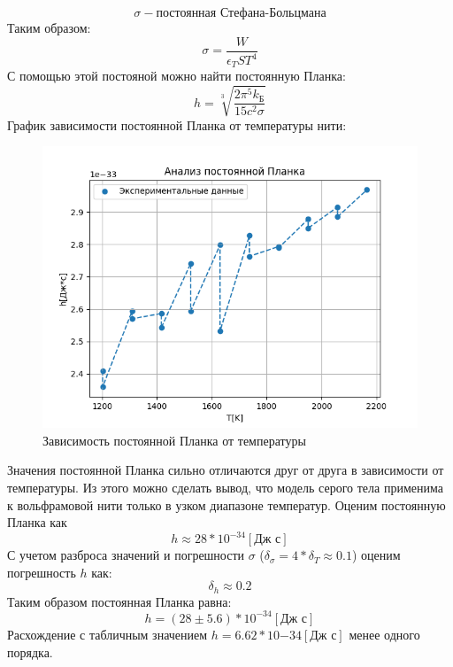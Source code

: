 \documentclass[a4paper,12pt]{article} %
\begin{document}
			\begin{equation}
				\sigma - \text{постоянная Стефана-Больцмана}
			\end{equation}
			Таким образом:
			\begin{equation}
				\sigma = \frac{W}{\epsilon_T ST^4}
			\end{equation}
			С помощью этой постояной можно найти постоянную Планка:
			\begin{equation}
				h =\sqrt[3]{\frac{2 \pi^5 k_\text{Б}}{15 c^2 \sigma}}
			\end{equation}
			График зависимости постоянной Планка от температуры нити:
			\begin{figure}[h]
				\centering
				\includegraphics[width=15cm]{img/Graph2.PNG}
				\caption{Зависимость постоянной Планка от температуры}
				\label{graph2}
			\end{figure}
			Значения постоянной Планка сильно отличаются друг от друга в зависимости от температуры.
			Из этого можно сделать вывод, что модель серого тела применима к вольфрамовой нити только в узком диапазоне температур.
			Оценим постоянную Планка как 
			\begin{equation}
				h \approx 28 * 10^{-34} [\text{Дж  с}]
			\end{equation}
			С учетом разброса значений и погрешности $\sigma$ ($\delta_\sigma = 4 * \delta_T \approx 0.1$) оценим погрешность $h$ как:
			\begin{equation}
				\delta_h \approx 0.2
			\end{equation}
			Таким образом постоянная Планка равна:
			\begin{equation}
				h = (28 \pm 5.6) * 10^{-34} [\text{Дж с}]
			\end{equation}
			Расхождение с табличным значением $h = 6.62 * 10{-34} [\text{Дж с}]$ менее одного порядка.
\end{document}
